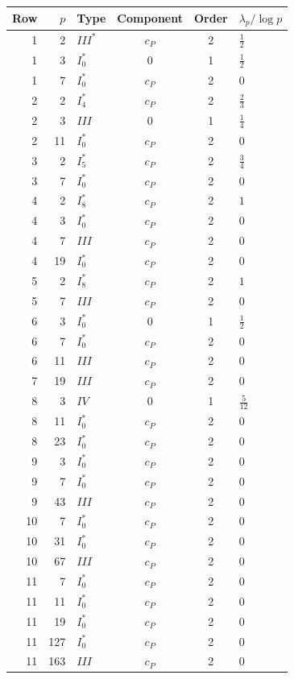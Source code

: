 \begin{longtable}{r r l c c l}
\toprule Row & $p$ & Type & Component & Order & $\lambda_p/\log p$\\\midrule\endhead
1 & 2 & $III^*$ & $c_P$ & 2 & $\frac{1}{2}$\\
1 & 3 & $I_0^*$ & $0$ & 1 & $\frac{1}{2}$\\
1 & 7 & $I_0^*$ & $c_P$ & 2 & $0$\\
2 & 2 & $I_{4}^*$ & $c_P$ & 2 & $\frac{2}{3}$\\
2 & 3 & $III$ & $0$ & 1 & $\frac{1}{4}$\\
2 & 11 & $I_0^*$ & $c_P$ & 2 & $0$\\
3 & 2 & $I_{5}^*$ & $c_P$ & 2 & $\frac{3}{4}$\\
3 & 7 & $I_0^*$ & $c_P$ & 2 & $0$\\
4 & 2 & $I_{8}^*$ & $c_P$ & 2 & $1$\\
4 & 3 & $I_0^*$ & $c_P$ & 2 & $0$\\
4 & 7 & $III$ & $c_P$ & 2 & $0$\\
4 & 19 & $I_0^*$ & $c_P$ & 2 & $0$\\
5 & 2 & $I_{8}^*$ & $c_P$ & 2 & $1$\\
5 & 7 & $III$ & $c_P$ & 2 & $0$\\
6 & 3 & $I_0^*$ & $0$ & 1 & $\frac{1}{2}$\\
6 & 7 & $I_0^*$ & $c_P$ & 2 & $0$\\
6 & 11 & $III$ & $c_P$ & 2 & $0$\\
7 & 19 & $III$ & $c_P$ & 2 & $0$\\
8 & 3 & $IV$ & $0$ & 1 & $\frac{5}{12}$\\
8 & 11 & $I_0^*$ & $c_P$ & 2 & $0$\\
8 & 23 & $I_0^*$ & $c_P$ & 2 & $0$\\
9 & 3 & $I_0^*$ & $c_P$ & 2 & $0$\\
9 & 7 & $I_0^*$ & $c_P$ & 2 & $0$\\
9 & 43 & $III$ & $c_P$ & 2 & $0$\\
10 & 7 & $I_0^*$ & $c_P$ & 2 & $0$\\
10 & 31 & $I_0^*$ & $c_P$ & 2 & $0$\\
10 & 67 & $III$ & $c_P$ & 2 & $0$\\
11 & 7 & $I_0^*$ & $c_P$ & 2 & $0$\\
11 & 11 & $I_0^*$ & $c_P$ & 2 & $0$\\
11 & 19 & $I_0^*$ & $c_P$ & 2 & $0$\\
11 & 127 & $I_0^*$ & $c_P$ & 2 & $0$\\
11 & 163 & $III$ & $c_P$ & 2 & $0$\\
\bottomrule\end{longtable}
